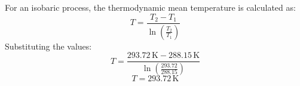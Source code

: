 For an isobaric process, the thermodynamic mean temperature is calculated as:  
\[
T = \frac{T_2 - T_1}{\ln\left(\frac{T_2}{T_1}\right)}
\]  
Substituting the values:  
\[
T = \frac{293.72 \, \text{K} - 288.15 \, \text{K}}{\ln\left(\frac{293.72}{288.15}\right)}
\]  
\[
T = 293.72 \, \text{K}
\]